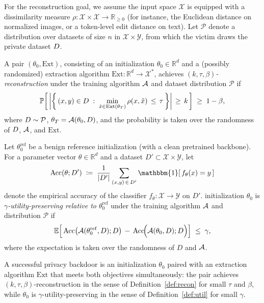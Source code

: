 For the reconstruction goal, we assume the input space $\mathcal{X}$ is equipped with a dissimilarity measure $\rho: \mathcal{X} \times \mathcal{X} \to \mathbb{R}_{\geq 0}$ (for instance, the Euclidean distance on normalized images, or a token-level edit distance on text). Let $\mathcal{P}$ denote a distribution over datasets of size $n$ in $\mathcal{X} \times \mathcal{Y}$, from which the victim draws the private dataset $D$.

\begin{definition}[Reconstruction]
    \label{def:recon}
    A pair $(\theta_0, \mathrm{Ext})$, consisting of an initialization $\theta_0 \in \mathbb{R}^d$ and a (possibly randomized) extraction algorithm $\mathrm{Ext}: \mathbb{R}^d \to \mathcal{X}^{\ast}$, achieves \emph{$(k, \tau, \beta)$-reconstruction} under the training algorithm $\mathcal{A}$ and dataset distribution $\mathcal{P}$ if 
    \[
      \mathbb{P}\!\left[\,\left|\left\{\, (x, y) \in D \;:\; \min_{\hat{x} \in \mathrm{Ext}(\theta_T)} \rho(x, \hat{x}) \,\leq\, \tau \,\right\}\right| \,\geq\, k \,\right] \;\geq\; 1 - \beta,
    \]
    where $D \sim \mathcal{P}$, $\theta_T = \mathcal{A}(\theta_0, D)$, and the probability is taken over the randomness of $D$,  $\mathcal{A}$, and $\mathrm{Ext}$.
\end{definition}


\begin{definition} 
\label{def:util}
    Let $\theta_0^{\mathrm{ref}}$ be a benign reference initialization (with a clean pretrained backbone). For a parameter vector $\theta \in \mathbb{R}^d$ and a dataset $D' \subset \mathcal{X} \times \mathcal{Y}$, let 
    \[
        \mathrm{Acc}(\theta; \dset') \;\coloneqq\; \frac{1}{|\dset'|} \sum_{(x, y) \,\in\, \dset'} \mathbbm{1}\!\left[\, f_\theta(x) = y \,\right]
    \]
    denote the empirical accuracy of the classifier $f_\theta: \mathcal{X} \to \mathcal{Y}$ on $D'$. initialization $\theta_0$ is \emph{$\gamma$-utility-preserving relative to $\theta_0^{\mathrm{ref}}$} under the training algorithm $\mathcal{A}$ and distribution $\mathcal{P}$ if 
    \[
      \mathbb{E}\!\left[\,\mathrm{Acc}\!\left(\mathcal{A}(\theta_0^{\mathrm{ref}}, D); D \right) \,-\, \mathrm{Acc}\!\Big(\mathcal{A}(\theta_0, D); D\Big)\right] \;\leq\; \gamma,
    \]
    where the expectation is taken over the randomness of $D$ and $\mathcal{A}$.
\end{definition}

A successful privacy backdoor is an initialization $\theta_0$ paired with an extraction algorithm $\mathrm{Ext}$ that meets both objectives simultaneously: the pair achieves $(k, \tau, \beta)$-reconstruction in the sense of Definition~\ref{def:recon} for small $\tau$ and $\beta$, while $\theta_0$ is $\gamma$-utility-preserving in the sense of Definition~\ref{def:util} for small $\gamma$.

